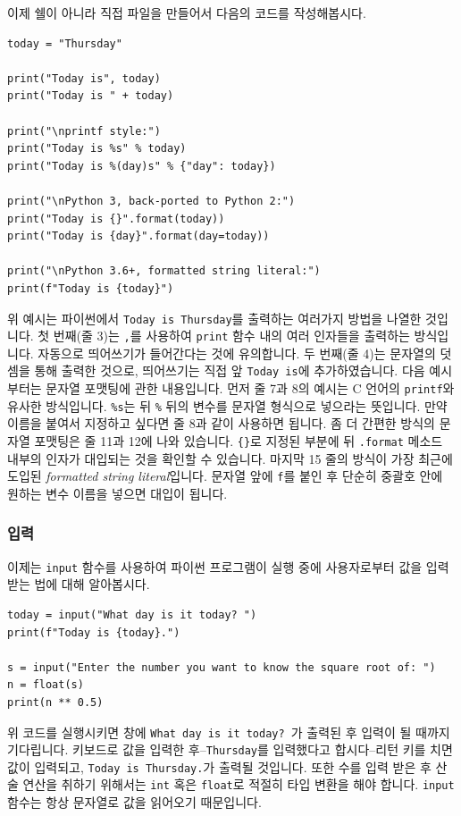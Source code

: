 \documentclass[../main.tex]{subfiles}
\begin{document}
이제 쉘이 아니라 직접 파일을 만들어서 다음의 코드를 작성해봅시다.
\begin{verbatim}
today = "Thursday"

print("Today is", today)
print("Today is " + today)

print("\nprintf style:")
print("Today is %s" % today)
print("Today is %(day)s" % {"day": today})

print("\nPython 3, back-ported to Python 2:")
print("Today is {}".format(today))
print("Today is {day}".format(day=today))

print("\nPython 3.6+, formatted string literal:")
print(f"Today is {today}")
\end{verbatim}
위 예시는 파이썬에서 \verb/Today is Thursday/를 출력하는 여러가지 방법을 나열한 것입니다.
첫 번째(줄 3)는 \verb/,/를 사용하여 \verb/print/ 함수 내의 여러 인자들을 출력하는 방식입니다.
자동으로 띄어쓰기가 들어간다는 것에 유의합니다.
두 번째(줄 4)는 문자열의 덧셈을 통해 출력한 것으로, 띄어쓰기는 직접 앞 \verb/Today is/에 추가하였습니다.
다음 예시부터는 문자열 포맷팅에 관한 내용입니다.
먼저 줄 7과 8의 예시는 C 언어의 \verb/printf/와 유사한 방식입니다.
\verb/%s/는 뒤 \verb/%/ 뒤의 변수를 문자열 형식으로 넣으라는 뜻입니다.
만약 이름을 붙여서 지정하고 싶다면 줄 8과 같이 사용하면 됩니다.
좀 더 간편한 방식의 문자열 포맷팅은 줄 11과 12에 나와 있습니다.
\verb/{}/로 지정된 부분에 뒤 \verb/.format/ 메소드 내부의 인자가 대입되는 것을 확인할 수 있습니다.
마지막 15 줄의 방식이 가장 최근에 도입된 \textit{formatted string literal}입니다.
문자열 앞에 \verb/f/를 붙인 후 단순히 중괄호 안에 원하는 변수 이름을 넣으면 대입이 됩니다.

\subsubsection{입력}
이제는 \verb/input/ 함수를 사용하여 파이썬 프로그램이 실행 중에 사용자로부터 값을 입력 받는 법에 대해 알아봅시다.
\begin{verbatim}
today = input("What day is it today? ")
print(f"Today is {today}.")

s = input("Enter the number you want to know the square root of: ")
n = float(s)
print(n ** 0.5)
\end{verbatim}
위 코드를 실행시키면 창에 \verb/What day is it today? /가 출력된 후 입력이 될 때까지 기다립니다.
키보드로 값을 입력한 후--\verb/Thursday/를 입력했다고 합시다--리턴 키를 치면 값이 입력되고, \verb/Today is Thursday./가 출력될 것입니다.
또한 수를 입력 받은 후 산술 연산을 취하기 위해서는 \verb/int/ 혹은 \verb/float/로 적절히 타입 변환을 해야 합니다.
\verb/input/ 함수는 항상 문자열로 값을 읽어오기 때문입니다.
\end{document}
